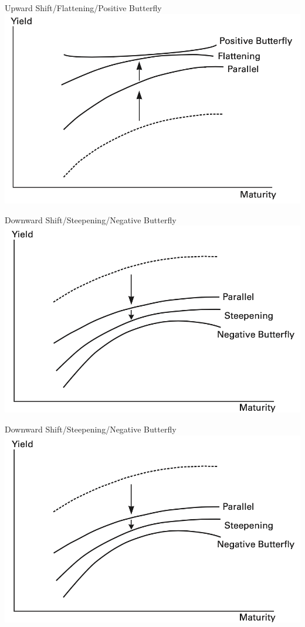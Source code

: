 \documentclass{beamer}
\begin{document}
\begin{frame}{Upward Shift/Flattening/Positive Butterfly}
\includegraphics[scale=0.7]{7}
\end{frame}


\begin{frame}{Downward Shift/Steepening/Negative Butterfly}
\includegraphics[scale=0.7]{8}
\end{frame}





\begin{frame}{Downward Shift/Steepening/Negative Butterfly}
\includegraphics[scale=0.7]{8}
\end{frame}
\end{document}
